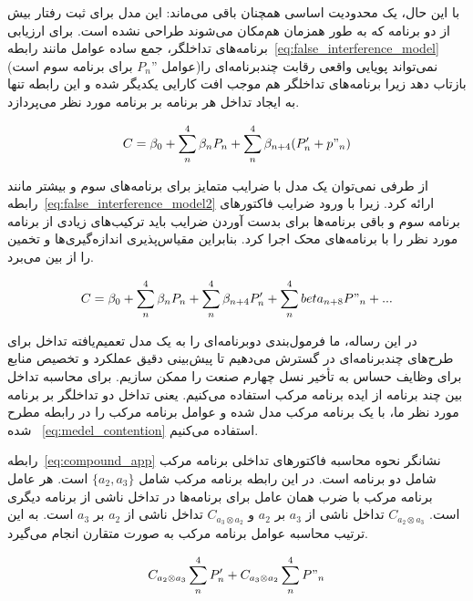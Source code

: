 با این حال، یک محدودیت اساسی همچنان باقی می‌ماند: این مدل برای ثبت رفتار بیش از دو برنامه که به طور همزمان هم‌مکان می‌شوند طراحی نشده است. برای ارزیابی برنامه‌های تداخلگر، جمع ساده عوامل مانند رابطه~\eqref{eq:false_interference_model} (عوامل $P_n”$ برای برنامه سوم است)نمی‌تواند پویایی واقعی رقابت چندبرنامه‌ای را بازتاب دهد زیرا برنامه‌های تداخلگر هم موجب افت کارایی یکدیگر شده و این رابطه تنها به ایجاد تداخل هر برنامه بر برنامه مورد نظر می‌پردازد. 

\begin{equation} \label{eq:false_interference_model}
    C = \beta_0 + \sum_n^4 \beta_n P_n + \sum_n^4 \beta_{n+4}(P'_n + p"_n)
\end{equation}

از طرفی نمی‌توان یک مدل با ضرایب متمایز برای برنامه‌های سوم و بیشتر مانند رابطه~\eqref{eq:false_interference_model2} ارائه کرد. زیرا با ورود ضرایب فاکتور‌های برنامه سوم و باقی برنامه‌ها برای بدست آوردن ضرایب باید ترکیب‌های زیادی از برنامه مورد نظر را با برنامه‌های محک اجرا کرد. بنابراین مقیاس‌پذیری اندازه‌گیری‌ها و تخمین را از بین می‌برد.

\begin{equation} \label{eq:false_interference_model2}
    C = \beta_0 + \sum_n^4 \beta_n P_n + \sum_n^4 \beta_{n+4}P'_n + \sum_n^4 beta_{n+8}P"_n + ...
\end{equation}

در این رساله، ما فرمول‌بندی دوبرنامه‌ای را به یک مدل تعمیم‌یافته تداخل برای طرح‌های چندبرنامه‌ای در  گسترش می‌دهیم تا پیش‌بینی دقیق عملکرد و تخصیص منابع برای وظایف حساس به تأخیر نسل چهارم صنعت را ممکن سازیم. برای محاسبه تداخل بین چند برنامه از ایده برنامه مرکب استفاده می‌کنیم. یعنی تداخل دو تداخلگر بر برنامه مورد نظر ما، با یک برنامه مرکب مدل شده و عوامل برنامه مرکب را در رابطه مطرح شده ~\eqref{eq:medel_contention} استفاده می‌کنیم.

رابطه~\eqref{eq:compound_app} نشانگر نحوه محاسبه فاکتور‌های تداخلی برنامه مرکب شامل دو برنامه است. در این رابطه برنامه مرکب شامل $\{a_2, a_3\}$ است. هر عامل برنامه مرکب با ضرب همان عامل برای برنامه‌ها در تداخل ناشی از برنامه دیگری است. $C_{a_2⊗a_3}$ تداخل ناشی از $a_3$ بر $a_2$ و $C_{a_3⊗a_2}$ تداخل ناشی از $a_2$ بر $a_3$ است. به این ترتیب محاسبه عوامل برنامه مرکب به صورت متقارن انجام می‌گیرد. 

\begin{equation} \label{eq:compound_app}
    C_{a_2 \otimes a_3} \sum_n^4 P'_n + C_{a_3 \otimes a_2} \sum_n^4 P"_n
\end{equation}

